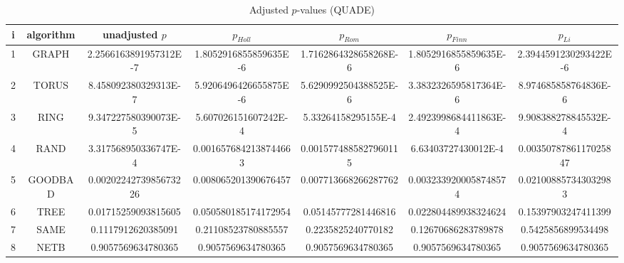 \documentclass[a4paper,10pt]{article}
\begin{document}
\begin{landscape}
\begin{table}[!htp]
\centering\scriptsize
\caption{Adjusted $p$-values (QUADE)}
\begin{tabular}{ccccccc}
i&algorithm&unadjusted $p$&$p_{Holl}$&$p_{Rom}$&$p_{Finn}$&$p_{Li}$\\
\hline
1& GRAPH&2.2566163891957312E-7&1.8052916855859635E-6&1.7162864328658268E-6&1.8052916855859635E-6&2.3944591230293422E-6\\
2& TORUS&8.458092380329313E-7&5.9206496426655875E-6&5.6290992504388525E-6&3.3832326595817364E-6&8.974685858764836E-6\\
3& RING&9.347227580390073E-5&5.607026151607242E-4&5.33264158295155E-4&2.4923998684411863E-4&9.908388278845532E-4\\
4& RAND&3.317568950336747E-4&0.0016576842138744663&0.0015774885827960115&6.63403727430012E-4&0.0035078786117025847\\
5& GOODBAD&0.0020224273985673226&0.008065201390676457&0.007713668266287762&0.0032339200058748574&0.021008857343032983\\
6& TREE&0.01715259093815605&0.050580185174172954&0.05145777281446816&0.022804489938324624&0.15397903247411399\\
7& SAME&0.1117912620385091&0.21108523780885557&0.2235825240770182&0.12670686283789878&0.5425856899534498\\
8& NETB&0.9057569634780365&0.9057569634780365&0.9057569634780365&0.9057569634780365&0.9057569634780365\\
\hline
\end{tabular}
\end{table}

\end{landscape}
\end{document}
